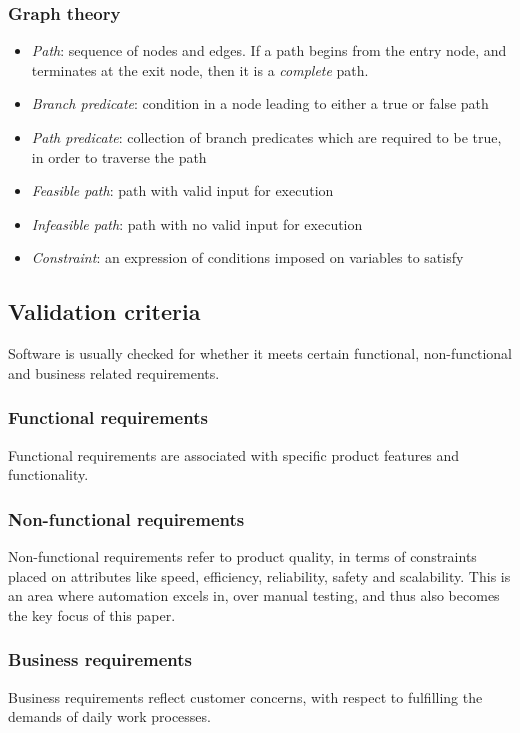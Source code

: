 \documentclass{icldt}
\numberwithin{equation}{section}       %
\begin{document}
\subsubsection{Graph theory}
\begin{itemize}
	\item \emph{Path}: sequence of nodes and edges. If a path begins from the entry node, and terminates at the exit node, then it is a \emph{complete} path.
	\item \emph{Branch predicate}: condition in a node leading to either a true or false path
	\item \emph{Path predicate}: collection of branch predicates which are required to be true, in order to traverse the path
	\item \emph{Feasible path}: path with valid input for execution
	\item \emph{Infeasible path}: path with no valid input for execution
	\item \emph{Constraint}: an expression of conditions imposed on variables to satisfy
\end{itemize}
\subsection{Validation criteria}
Software is usually checked for whether it meets certain functional, non-functional and business related requirements.

\subsubsection{Functional requirements}
Functional requirements are associated with specific product features and functionality.

\subsubsection{Non-functional requirements}
Non-functional requirements refer to product quality, in terms of constraints placed on attributes like speed, efficiency, reliability, safety and scalability. This is an area where automation excels in, over manual testing, and thus also becomes the key focus of this paper.

\subsubsection{Business requirements}
Business requirements reflect customer concerns, with respect to fulfilling the demands of daily work processes.
\end{document}
